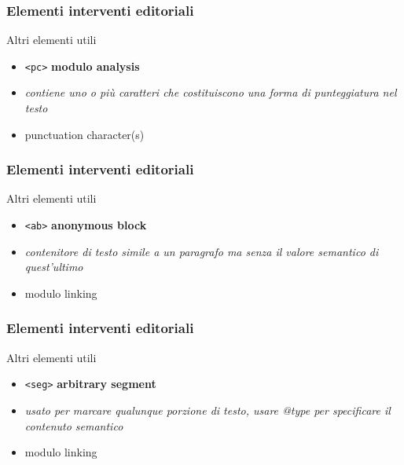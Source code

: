 \begin{frame}
    \frametitle{Elementi interventi editoriali}
    \addtocounter{nframe}{1}
    
    \begin{block}{Altri elementi utili}
        \begin{itemize}
            \item \texttt{<pc>} \textbf{modulo analysis}
            \item[] \textit{contiene uno o più caratteri che costituiscono una forma di punteggiatura nel testo}
            \item[] punctuation character(s)
        \end{itemize}
        
    \end{block}
    
\end{frame}


\begin{frame}
    \frametitle{Elementi interventi editoriali}
    \addtocounter{nframe}{1}
    
    \begin{block}{Altri elementi utili}
        \begin{itemize}
            \item \texttt{<ab>} \textbf{anonymous block}
            \item[] \textit{contenitore di testo simile a un paragrafo ma senza il valore semantico di quest’ultimo}
            \item[] modulo linking
        \end{itemize}
        
    \end{block}
    
\end{frame} 

\begin{frame}
    \frametitle{Elementi interventi editoriali}
    \addtocounter{nframe}{1}
    
    \begin{block}{Altri elementi utili}
        \begin{itemize}
            \item \texttt{<seg>} \textbf{arbitrary segment}
            \item[] \textit{usato per marcare qualunque porzione di testo, usare @type per specificare il contenuto semantico}
            \item[] modulo linking
        \end{itemize}
        
    \end{block}
    
\end{frame} 

